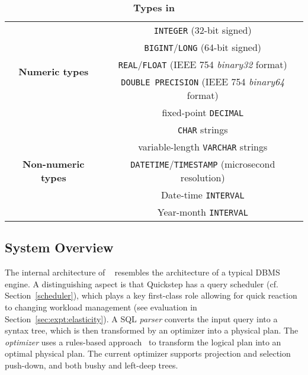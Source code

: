 \begin{table}[t]
	\centering
	\begin{tabular}{|c|c|} \hline
		\multirow{5}{*}{\textbf{Numeric types}} &  \small{\texttt{INTEGER} (32-bit signed)} \\ & \small{\texttt{BIGINT}/\texttt{LONG} (64-bit signed)} \\  & \small{\texttt{REAL}/\texttt{FLOAT} (IEEE 754 \textit{binary32} format)} \\ & \small{\texttt{DOUBLE PRECISION} (IEEE 754 \textit{binary64} format)} \\ & \small{fixed-point \texttt{DECIMAL}} \\ \hline
		\multirow{5}{*}{\textbf{Non-numeric types}} & \texttt{CHAR} strings \\ & variable-length  \texttt{VARCHAR} strings \\ & \texttt{DATETIME}/\texttt{TIMESTAMP} (microsecond resolution) \\ & Date-time \texttt{INTERVAL} \\ & Year-month \texttt{INTERVAL} \\ \hline  
	\end{tabular}
	\caption{\textbf{Types in \Quickstep}}
	\label{table:types}
\end{table}


\subsection{System Overview} \label{overview}
The internal architecture of \Quickstep\ %
resembles the architecture of a typical DBMS engine. A distinguishing aspect is that Quickstep has a query scheduler (cf. Section~\ref{scheduler}), which plays a key first-class role allowing for quick reaction to changing workload management (see evaluation in Section~\ref{sec:expt:elasticity}). A SQL \textit{parser} converts the input query into a syntax tree, which is then transformed by an optimizer into a physical plan. The \textit{optimizer} %
uses a rules-based approach~\cite{Volcano} to transform the logical plan into an optimal physical plan. %
The current optimizer %
supports projection and selection push-down, and both bushy and left-deep trees. 

